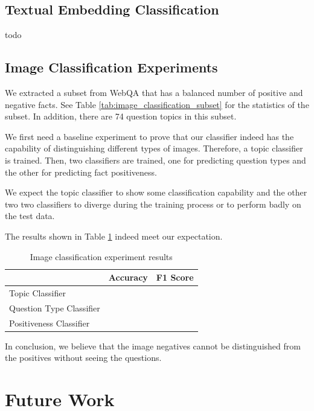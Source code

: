 \documentclass[nohyperref]{article}
\theoremstyle{plain}
\theoremstyle{definition}
\theoremstyle{remark}
\begin{document}
    \subsection{Textual Embedding Classification}
    todo

    \subsection{Image Classification Experiments}

    We extracted a subset from WebQA that has a balanced number of positive and negative facts.
    See Table \ref{tab:image_classification_subset} for the statistics of the subset.
    In addition, there are 74 question topics in this subset.

    We first need a baseline experiment to prove that our classifier indeed has the capability of
    distinguishing different types of images.
    Therefore, a topic classifier is trained.
    Then, two classifiers are trained, one for predicting question types and the other for predicting fact positiveness.

    We expect the topic classifier to show some classification capability and
    the other two two classifiers to diverge during the training process or to perform badly on the test data.

    The results shown in Table \ref{tab:image_classification_results} indeed meet our expectation.
    \begin{table}[h]
        \centering
        \footnotesize
        \begin{tabular}{lll}
            & Accuracy & F1 Score \\
            \toprule
            Topic Classifier         &          &          \\
            \midrule
            Question Type Classifier &          &          \\
            \midrule
            Positiveness Classifier  &          &          \\
            \bottomrule
        \end{tabular}
        \caption{Image classification experiment results}
        \label{tab:image_classification_results}
        \vspace{-5pt}
    \end{table}

    In conclusion, we believe that the image negatives cannot be distinguished from the positives without seeing the
    questions.


    \section{Future Work}

    \clearpage

    
    
\end{document}
